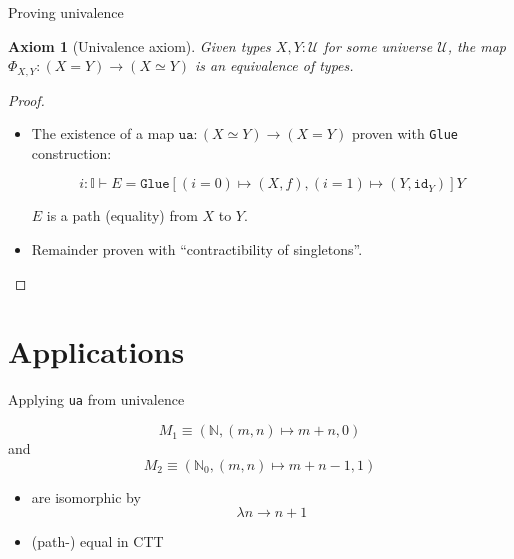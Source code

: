 \documentclass[english,draft]{beamer}
\newtheorem{axiom}[theorem]{Axiom}
\begin{document}
\begin{frame}{Proving univalence}

\begin{axiom}[Univalence axiom]
 Given types $X,Y : \mathcal{U}$ for some universe $\mathcal{U}$, the map $\Phi_{X,Y}: (X=Y) \rightarrow (X \simeq Y)$ is an equivalence of types. 
\end{axiom}


 

\begin{proof}

\begin{itemize}

\item The existence of a map $\texttt{ua} : (X\simeq Y) \rightarrow (X = Y)$ proven with \texttt{Glue} construction:
 
 
 $$i : \mathbb{I} \vdash E= \texttt{Glue} \left[ (i=0) \mapsto (X, f),(i=1) \mapsto\left(Y, \texttt{id}_{Y}\right) \right] Y$$
 
 $E$ is a path (equality) from $X$ to $Y$.
 
 \item Remainder proven with ``contractibility of singletons''.
 
 \end{itemize}
\end{proof} 

\end{frame}


\section{Applications}


\begin{frame}{Applying \texttt{ua} from univalence }
 
 \begin{example}[Monoids]
 
 $$M_1  \equiv (\mathbb{N}, (m,n)\mapsto m+n, 0)$$ and $$M_2 \equiv (\mathbb{N}_0, (m,n)\mapsto m+n -1, 1)$$
\begin{itemize}
 \item  are isomorphic by $$\lambda n \rightarrow n + 1 $$ 
 \item (path-) equal in CTT
\end{itemize}
 
 \end{example}
 

 
\end{frame}
\end{document}
